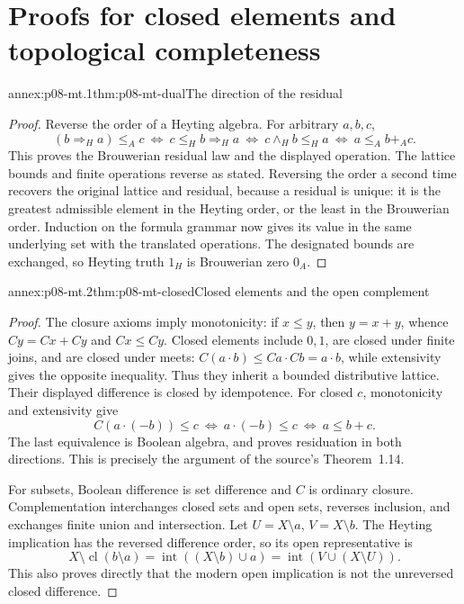 \section{Proofs for closed elements and topological completeness}
\label{annex:p08-mt-topological-completeness}

\begin{annexitem}{annex:p08-mt.1}{thm:p08-mt-dual}{The direction of the residual}
\begin{proof}
Reverse the order of a Heyting algebra. For arbitrary \(a,b,c\),
\[
 (b\Rightarrow_H a)\leq_A c
 \ \Longleftrightarrow\ c\leq_H b\Rightarrow_H a
 \ \Longleftrightarrow\ c\wedge_H b\leq_H a
 \ \Longleftrightarrow\ a\leq_A b+_A c.
\]
This proves the Brouwerian residual law and the displayed operation.
The lattice bounds and finite operations reverse as stated. Reversing
the order a second time recovers the original lattice and residual,
because a residual is unique: it is the greatest admissible element in
the Heyting order, or the least in the Brouwerian order. Induction on the
formula grammar now gives its value in the same underlying set with
the translated operations. The designated bounds are exchanged, so
Heyting truth \(1_H\) is Brouwerian zero \(0_A\).
\end{proof}
\end{annexitem}

\begin{annexitem}{annex:p08-mt.2}{thm:p08-mt-closed}{Closed elements and the open complement}
\begin{proof}
The closure axioms imply monotonicity: if \(x\leq y\), then
\(y=x+y\), whence \(Cy=Cx+Cy\) and \(Cx\leq Cy\).
Closed elements include \(0,1\), are closed under finite joins, and are
closed under meets: \(C(a\cdot b)\leq Ca\cdot Cb=a\cdot b\), while
extensivity gives the opposite inequality. Thus they inherit a bounded
distributive lattice. Their displayed difference is closed by idempotence.
For closed \(c\), monotonicity and extensivity give
\[
 C(a\cdot(-b))\leq c
 \ \Longleftrightarrow\ a\cdot(-b)\leq c
 \ \Longleftrightarrow\ a\leq b+c.
\]
The last equivalence is Boolean algebra, and proves residuation in both
directions. This is precisely the argument of the source's Theorem~1.14.

For subsets, Boolean difference is set difference and \(C\) is ordinary
closure. Complementation interchanges closed sets and open sets,
reverses inclusion, and exchanges finite union and intersection. Let
\(U=X\setminus a\), \(V=X\setminus b\). The Heyting implication has
the reversed difference order, so its open representative is
\[
 X\setminus\operatorname{cl}(b\setminus a)
 =\operatorname{int}((X\setminus b)\cup a)
 =\operatorname{int}(V\cup(X\setminus U)).
\]
This also proves directly that the modern open implication is not the
unreversed closed difference.
\end{proof}
\end{annexitem}


